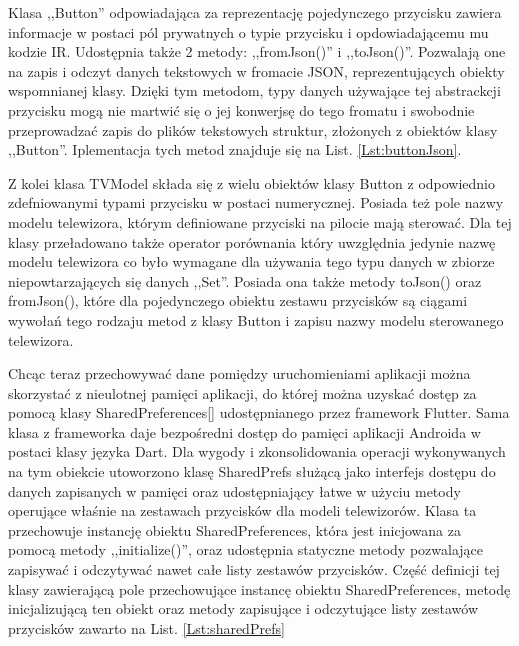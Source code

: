 \documentclass[12pt,twoside,draft]{article}
\begin{document}
Klasa ,,Button'' odpowiadająca za reprezentację  pojedynczego przycisku zawiera informacje w postaci pól prywatnych o typie przycisku i opdowiadającemu mu kodzie IR. Udostępnia także 2 metody: ,,fromJson()'' i ,,toJson()''. Pozwalają one na zapis i odczyt danych tekstowych w fromacie JSON, reprezentujących obiekty wspomnianej klasy. Dzięki tym metodom, typy danych używające tej abstrackcji przycisku mogą nie martwić się o jej konwerjsę do tego fromatu i swobodnie przeprowadzać zapis do plików tekstowych struktur, złożonych z obiektów klasy ,,Button''. Iplementacja tych metod znajduje się na List. \ref*{Lst:buttonJson}.


Z kolei klasa TVModel składa się z wielu obiektów klasy Button z odpowiednio zdefniowanymi typami przycisku w postaci numerycznej. Posiada też pole nazwy modelu telewizora, którym definiowane przyciski na pilocie mają sterować. Dla tej klasy przeładowano także operator porównania który uwzględnia jedynie nazwę modelu telewizora co było wymagane dla używania tego typu danych w zbiorze niepowtarzających się danych ,,Set''. Posiada ona także metody toJson() oraz fromJson(), które dla pojedynczego obiektu zestawu przycisków są ciągami wywołań tego rodzaju metod z klasy Button i zapisu nazwy modelu sterowanego telewizora. 

Chcąc teraz przechowywać dane pomiędzy uruchomieniami aplikacji można skorzystać z nieulotnej pamięci aplikacji, do której można uzyskać dostęp za pomocą klasy SharedPreferences[] udostępnianego przez framework Flutter. Sama klasa z frameworka daje bezpośredni dostęp do pamięci aplikacji Androida w postaci klasy języka Dart. Dla wygody i zkonsolidowania operacji wykonywanych na tym obiekcie utoworzono klasę SharedPrefs służącą jako interfejs dostępu do danych zapisanych w pamięci oraz udostępniający łatwe w użyciu metody operujące właśnie na zestawach przycisków dla modeli telewizorów. Klasa ta przechowuje instancję obiektu SharedPreferences, która jest inicjowana za pomocą metody ,,initialize()'', oraz udostępnia statyczne metody pozwalające zapisywać i odczytywać nawet całe listy zestawów przycisków. Część definicji tej klasy zawierającą pole przechowujące instancę obiektu SharedPreferences, metodę inicjalizującą ten obiekt oraz metody zapisujące i odczytujące listy zestawów przycisków zawarto na List. \ref*{Lst:sharedPrefs}


\end{document}
